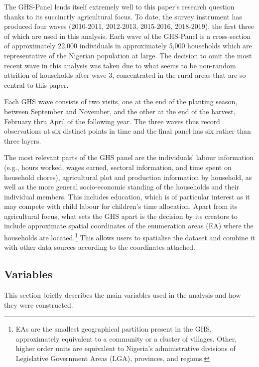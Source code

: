 \documentclass[a4paper,12pt]{article}
\theoremstyle{plain}
\theoremstyle{definition}
\theoremstyle{definition}
\theoremstyle{definition}
\theoremstyle{definition}
\begin{document}
The GHS-Panel lends itself extremely well to this paper's research question thanks to its succinctly agricultural focus. To date, the survey instrument has produced four waves (2010-2011, 2012-2013, 2015-2016, 2018-2019), the first three of which are used in this analysis. Each wave of the GHS-Panel is a cross-section of approximately 22,000 individuals in approximately 5,000 households which are representative of the Nigerian population at large. The decision to omit the most recent wave in this analysis was taken due to what seems to be non-random attrition of households after wave 3, concentrated in the rural areas that are so central to this paper.

Each GHS wave consists of two visits, one at the end of the planting season, between September and November, and the other at the end of the harvest, February thru April of the following year. The three waves thus record observations at six distinct points in time and the final panel has six rather than three layers.

The most relevant parts of the GHS panel are the individuals' labour information (e.g., hours worked, wages earned, sectoral information, and time spent on household chores), agricultural plot and production information by household, as well as the more general socio-economic standing of the households and their individual members. This includes education, which is of particular interest as it may compete with child labour for children's time allocation. Apart from its agricultural focus, what sets the GHS apart is the decision by its creators to include approximate spatial coordinates of the enumeration areas (EA) where the households are located.\footnote{EAs are the smallest geographical partition present in the GHS, approximately equivalent to a community or a cluster of villages. Other, higher order units are equivalent to Nigeria's administrative divisions of Legislative Government Areas (LGA), provinces, and regions.} This allows users to spatialise the dataset and combine it with other data sources according to the coordinates attached.

\subsection{Variables}
\label{sub:variables}

This section briefly describes the main variables used in the analysis and how they were constructed.
\end{document}
